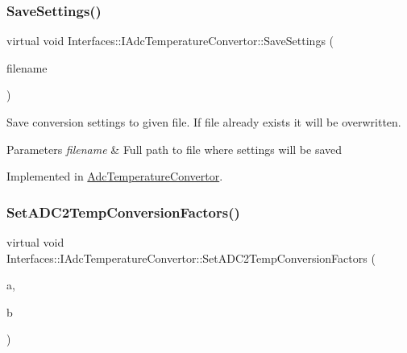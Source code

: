 \mbox{\label{class_interfaces_1_1_i_adc_temperature_convertor_a6631e979e067ab78d3e5c337449876ac}} 
\subsubsection{\texorpdfstring{Save\+Settings()}{SaveSettings()}}
{\footnotesize\ttfamily virtual void Interfaces\+::\+I\+Adc\+Temperature\+Convertor\+::\+Save\+Settings (\begin{DoxyParamCaption}\item[{Q\+String}]{filename }\end{DoxyParamCaption})\hspace{0.3cm}{\ttfamily [pure virtual]}}



Save conversion settings to given file. If file already exists it will be overwritten. 


\begin{DoxyParams}{Parameters}
{\em filename} & Full path to file where settings will be saved \\
\hline
\end{DoxyParams}


Implemented in \hyperlink{class_adc_temperature_convertor_aa6935469c6bb9e2df9a21495d7e8b72a}{Adc\+Temperature\+Convertor}.

\mbox{\label{class_interfaces_1_1_i_adc_temperature_convertor_a3e4c9204b3593bc434a041c7a69c430f}} 
\subsubsection{\texorpdfstring{Set\+A\+D\+C2\+Temp\+Conversion\+Factors()}{SetADC2TempConversionFactors()}}
{\footnotesize\ttfamily virtual void Interfaces\+::\+I\+Adc\+Temperature\+Convertor\+::\+Set\+A\+D\+C2\+Temp\+Conversion\+Factors (\begin{DoxyParamCaption}\item[{double}]{a,  }\item[{double}]{b }\end{DoxyParamCaption})\hspace{0.3cm}{\ttfamily [pure virtual]}}



